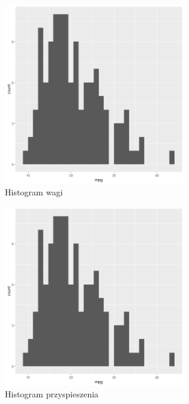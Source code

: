\documentclass{article}
\begin{document}
            \begin{figure}[H]
                \caption{Histogram wagi}
                \centering
                \includegraphics[width=0.7\textwidth]{../histograms/mpg_hist.jpeg}
            \end{figure}
            \begin{figure}[H]
                \caption{Histogram przyspieszenia}
                \centering
                \includegraphics[width=0.7\textwidth]{../histograms/mpg_hist.jpeg}
            \end{figure}
\end{document}
